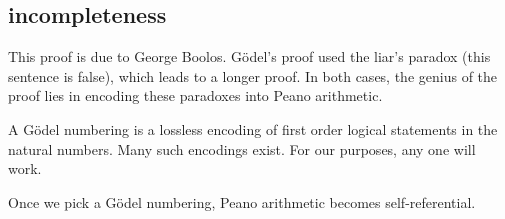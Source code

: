 \documentclass{scrbook}
\begin{document}
\subsection{incompleteness} 
This proof is due to George Boolos. Gödel's proof used the liar's paradox (this sentence is false), which leads to a longer proof.\cite{wiki:incomplete-sketch} In both cases, the genius of the proof lies in encoding these paradoxes into Peano arithmetic. 

\begin{defn}
  A Gödel numbering is a lossless encoding of first order logical statements in the natural numbers. Many such encodings exist. For our purposes, any one will work. 
\end{defn}
Once we pick a Gödel numbering, Peano arithmetic becomes self-referential.  
\end{document}
